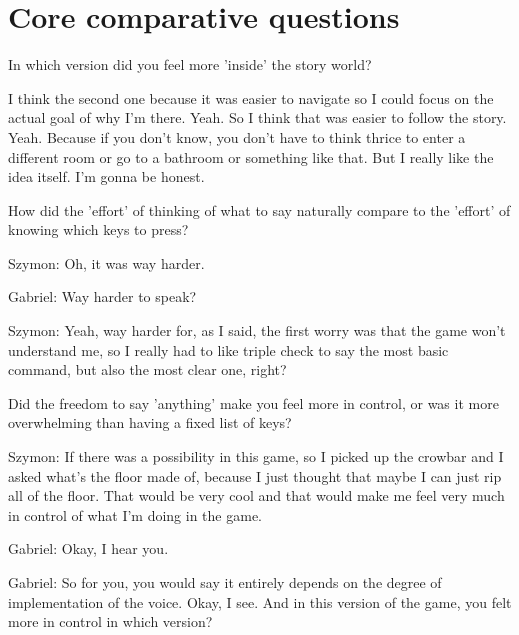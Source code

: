 \section{Core comparative questions}

\begin{QandA}
   \item In which version did you feel more 'inside' the story world?
         \begin{answered}
            I think the second one because it was easier to navigate so I could focus on the actual goal of why I'm there.
            Yeah.
            So I think that was easier to follow the story.
            Yeah.
            Because if you don't know, you don't have to think thrice to enter a different room or go to a bathroom or something like that.
            But I really like the idea itself.
            I'm gonna be honest.
           
         \end{answered}

   \item How did the 'effort' of thinking of what to say naturally compare to the 'effort' of knowing which keys to press?

         \begin{answered}
            Szymon: Oh, it was way harder.

            Gabriel: Way harder to speak?

            Szymon: Yeah, way harder for, as I said, the first worry was that the game won't understand me, so I really had to like triple check to say the most basic command, but also the most clear one, right?
         \end{answered}

    \item Did the freedom to say 'anything' make you feel more in control, or was it more overwhelming than having a fixed list of keys?

         \begin{answered}
            Szymon: If there was a possibility in this game, so I picked up the crowbar and I asked what's the floor made of, because I just thought that maybe I can just rip all of the floor.
            That would be very cool and that would make me feel very much in control of what I'm doing in the game.

            Gabriel: Okay, I hear you.

            Gabriel: So for you, you would say it entirely depends on the degree of implementation of the voice.
            Okay, I see.
            And in this version of the game,
            you felt more in control in which version?


\end{answered}
\end{QandA}
